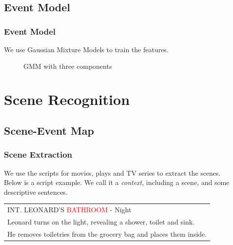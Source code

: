 \documentclass[xcolor=table,slidestop,compress,mathserif]{beamer}
\begin{document}
\subsection{Event Model}
\begin{frame}
	\frametitle{Event Model}	
	We use Gaussian Mixture Models to train the features. 
	\begin{figure}
		\resizebox{0.8\totalheight}{!}{}
		\caption{GMM with three components}
	\end{figure}
\end{frame}
\section{Scene Recognition}
\subsection{Scene-Event Map}
\begin{frame}
	\frametitle{Scene Extraction}	
	We use the scripts for movies, plays and TV series to extract the scenes. \\ 
	Below is a script example. 
	We call it a \textit{context}, including a scene, and some descriptive sentences. 
	\begin{table}[h]
		\begin{tabular}{|l|}
		\hline
		INT. LEONARD'S \textcolor{red}{BATHROOM} - Night \\ 
		Leonard turns on the light, revealing a shower, toilet and sink.\\
		He removes toiletries from the grocery bag and places them inside. \\ 
		\hline
		\end{tabular}
	\end{table}

\end{frame}
\end{document}
